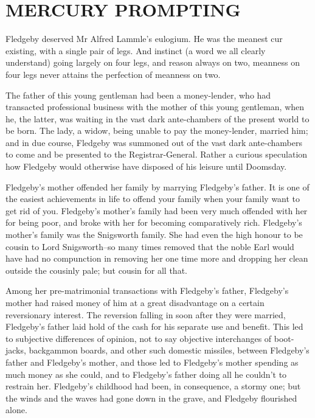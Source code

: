 
\chapter{MERCURY PROMPTING}

Fledgeby deserved Mr Alfred Lammle’s eulogium. He was the meanest
cur existing, with a single pair of legs. And instinct (a word we all
clearly understand) going largely on four legs, and reason always on
two, meanness on four legs never attains the perfection of meanness on
two.

The father of this young gentleman had been a money-lender, who
had transacted professional business with the mother of this
young gentleman, when he, the latter, was waiting in the vast dark
ante-chambers of the present world to be born. The lady, a widow, being
unable to pay the money-lender, married him; and in due course, Fledgeby
was summoned out of the vast dark ante-chambers to come and be presented
to the Registrar-General. Rather a curious speculation how Fledgeby
would otherwise have disposed of his leisure until Doomsday.

Fledgeby’s mother offended her family by marrying Fledgeby’s father. It
is one of the easiest achievements in life to offend your family when
your family want to get rid of you. Fledgeby’s mother’s family had
been very much offended with her for being poor, and broke with her
for becoming comparatively rich. Fledgeby’s mother’s family was the
Snigsworth family. She had even the high honour to be cousin to Lord
Snigsworth--so many times removed that the noble Earl would have had no
compunction in removing her one time more and dropping her clean outside
the cousinly pale; but cousin for all that.

Among her pre-matrimonial transactions with Fledgeby’s father,
Fledgeby’s mother had raised money of him at a great disadvantage on a
certain reversionary interest. The reversion falling in soon after they
were married, Fledgeby’s father laid hold of the cash for his separate
use and benefit. This led to subjective differences of opinion, not to
say objective interchanges of boot-jacks, backgammon boards, and other
such domestic missiles, between Fledgeby’s father and Fledgeby’s mother,
and those led to Fledgeby’s mother spending as much money as she
could, and to Fledgeby’s father doing all he couldn’t to restrain her.
Fledgeby’s childhood had been, in consequence, a stormy one; but the
winds and the waves had gone down in the grave, and Fledgeby flourished
alone.

